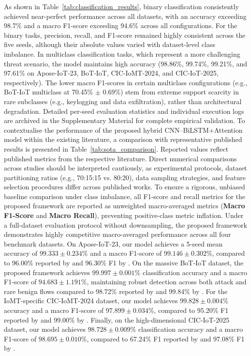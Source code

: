 \documentclass[a4paper,fleqn]{cas-sc}
\begin{document}
As shown in Table~\ref{tab:classification_results}, binary classification consistently achieved near-perfect performance across all datasets, with an accuracy exceeding 98.7\% and a macro F1-score exceeding 94.6\% across all configurations. For the binary tasks, precision, recall, and F1-score remained highly consistent across the five seeds, although their absolute values varied with dataset-level class imbalance. In multiclass classification tasks, which represent a more challenging threat scenario, the model maintains high accuracy (98.86\%, 99.74\%, 99.21\%, and 97.61\% on Apose-IoT-23, BoT-IoT, CIC-IoMT-2024, and CIC-IoT-2025, respectively). The lower macro F1-scores in certain multiclass configurations (e.g., BoT-IoT multiclass at 70.45\% $\pm$ 0.69\%) stem from extreme support scarcity in rare subclasses (e.g., keylogging and data exfiltration), rather than architectural degradation. Detailed per-seed evaluation statistics and individual execution logs are archived in the Supplementary Material for complete empirical validation. To contextualise the performance of the proposed hybrid CNN--BiLSTM+Attention model within the existing literature, a comparison with representative published results is presented in Table~\ref{tab:sota_comparison}. Reported values reflect published metrics from the respective literature. Direct numerical comparisons across studies should be interpreted cautiously, as experimental protocols, dataset partitioning ratios (e.g., 70:15:15 vs. 80:20), data sampling strategies, and feature selection procedures differ across published works. To ensure a rigorous, unbiased baseline comparison under class imbalance, all F1-score and recall metrics for the proposed framework are reported as unweighted macro-averaged metrics (\textbf{Macro F1-Score} and \textbf{Macro Recall}), preventing positive-class metric inflation. Under a full-dataset evaluation protocol without downsampling, the proposed framework demonstrates highly competitive macro-averaged performance across all four benchmark datasets. On Apose-IoT-23, our model achieves a 5-seed mean accuracy of $99.333 \pm 0.234\%$ and a macro F1-score of $99.146 \pm 0.302\%$, compared to 96.00\% reported by \cite{SAHU2021146} and 96.30\% F1 by \cite{patil2025hybrid}. On the massive BoT-IoT dataset, the proposed framework achieves $99.997 \pm 0.001\%$ classification accuracy and a macro F1-score of $94.683 \pm 1.191\%$, maintaining robust detection across both attack and rare benign flows compared to 98.72\% reported by \cite{moustafa2015bot} and 99.84\% by \cite{yan2023deep}. For the IoMT-specific CIC-IoMT-2024 dataset, our model achieves $99.828 \pm 0.004\%$ accuracy and a macro F1-score of $97.899 \pm 0.034\%$, compared to 95.20\% F1 reported by \cite{iomt2024dataset} and 99.00\% by \cite{shaaban2023biomt}. Finally, on the high-dimensional CIC-IoT-2025 dataset, our model achieves $98.728 \pm 0.009\%$ classification accuracy and a macro F1-score of $98.695 \pm 0.010\%$, compared to 67.24\% F1 reported by \citep{ciciot2025dataset} and 97.08\% F1 by \citep{Shibly1813265}.
\end{document}
